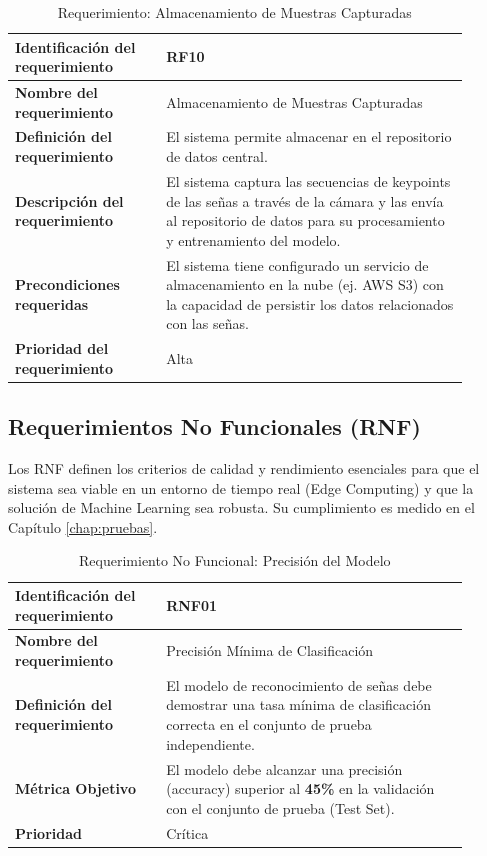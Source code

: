 \begin{table}[H]
    \centering
    \begin{tabular}{|p{0.3\linewidth}|p{0.6\linewidth}|}
        \hline
        \textbf{Identificación del requerimiento} & RF10 \\
        \hline
        \textbf{Nombre del requerimiento} & Almacenamiento de Muestras Capturadas \\
        \hline
        \textbf{Definición del requerimiento} & El sistema permite almacenar en el repositorio de datos central. \\
        \hline
        \textbf{Descripción del requerimiento} & El sistema captura las secuencias de keypoints de las señas a través de la cámara y las envía al repositorio de datos para su procesamiento y entrenamiento del modelo. \\
        \hline
        \textbf{Precondiciones requeridas} & El sistema tiene configurado un servicio de almacenamiento en la nube (ej. AWS S3) con la capacidad de persistir los datos relacionados con las señas. \\
        \hline
        \textbf{Prioridad del requerimiento} & Alta \\
        \hline
    \end{tabular}
    \caption{Requerimiento: Almacenamiento de Muestras Capturadas}
    \label{tab:rf-almacenamiento-muestras}
\end{table}

\clearpage

\subsection{Requerimientos No Funcionales (RNF)} \label{sec:requerimientos_no_funcionales}

Los RNF definen los criterios de calidad y rendimiento esenciales para que el sistema sea viable en un entorno de tiempo real (Edge Computing) y que la solución de Machine Learning sea robusta. Su cumplimiento es medido en el Capítulo \ref{chap:pruebas}.

\begin{table}[H]
    \centering
    \begin{tabular}{|p{0.3\linewidth}|p{0.6\linewidth}|}
        \hline
        \textbf{Identificación del requerimiento} & RNF01 \\
        \hline
        \textbf{Nombre del requerimiento} & Precisión Mínima de Clasificación \\
        \hline
        \textbf{Definición del requerimiento} & El modelo de reconocimiento de señas debe demostrar una tasa mínima de clasificación correcta en el conjunto de prueba independiente. \\
        \hline
        \textbf{Métrica Objetivo} & El modelo debe alcanzar una precisión (accuracy) superior al \textbf{45\%} en la validación con el conjunto de prueba (Test Set). \\
        \hline
        \textbf{Prioridad} & Crítica \\
        \hline
    \end{tabular}
    \caption{Requerimiento No Funcional: Precisión del Modelo}
    \label{tab:rnf-precision}
\end{table}

